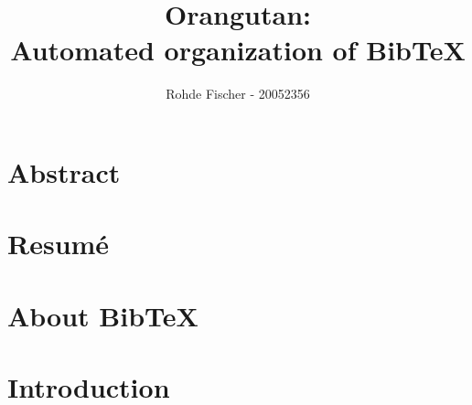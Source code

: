 \documentclass[twoside,11pt,openright,a4paper]{report}
\newcommand{\Orangutan}{Orangutan}
\begin{document}
\pagestyle{empty}
\begin{titlepage}
\author{Rohde Fischer - 20052356}
\title{{\Orangutan}:\\Automated organization of Bib\TeX}
\maketitle

\end{titlepage}


\pagestyle{plain}
\setcounter{page}{1}

\chapter*{Abstract}

\chapter*{Resum\'e}


%
%
%
\tableofcontents

\setcounter{secnumdepth}{2}


\chapter{About Bib{\TeX}}
\label{ch:about}



\chapter{Introduction}
\label{ch:intro}
\end{document}
